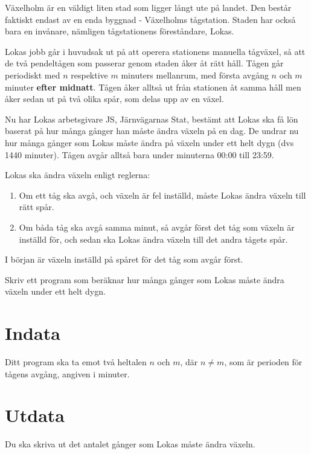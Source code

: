 
Växelholm är en väldigt liten stad som ligger långt ute på landet. Den består faktiskt endast av
en enda byggnad - Växelholms tågstation. Staden har också bara en invånare, nämligen tågstationens
föreståndare, Lokas. 

Lokas jobb går i huvudsak ut på att operera stationens manuella tågväxel, så att de två pendeltågen
som passerar genom staden åker åt rätt håll. Tågen går periodiskt med $n$ respektive $m$ minuters
mellanrum, med första avgång $n$ och $m$ minuter \textbf{efter midnatt}. Tågen åker alltså ut från stationen
åt samma håll men åker sedan ut på två olika spår, som delas upp av en växel.

Nu har Lokas arbetsgivare JS, Järnvägarnas Stat, bestämt att Lokas ska få lön baserat på hur många
gånger han måste ändra växeln på en dag. De undrar nu hur många gånger som Lokas måste ändra på växeln
under ett helt dygn (dvs 1440 minuter). Tågen avgår alltså bara under minuterna 00:00 till 23:59. 

Lokas ska ändra växeln enligt reglerna:
\begin{enumerate}
\item Om ett tåg ska avgå, och växeln är fel inställd, måste Lokas ändra växeln till rätt spår.
\item Om båda tåg ska avgå samma minut, så avgår först det tåg som växeln är inställd för, och sedan ska Lokas ändra växeln till det andra tågets spår.
\end{enumerate}

I början är växeln inställd på spåret för det tåg som avgår först. 

Skriv ett program som beräknar hur många gånger som Lokas måste ändra växeln under ett helt dygn.

\section*{Indata}
Ditt program ska ta emot två heltalen $n$ och $m$, där $n \not= m$, som är perioden för tågens avgång, angiven i minuter.

\section*{Utdata}
Du ska skriva ut det antalet gånger som Lokas måste ändra växeln.
